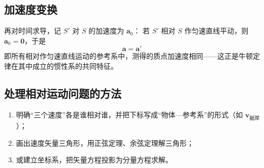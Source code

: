     \subsection{加速度变换}
    再对时间求导，记 $S'$ 对 $S$ 的加速度为 $\boldsymbol{a}_{0}$：
    若 $S'$ 相对 $S$ 作匀速直线平动，则 $\boldsymbol{a}_{0}=\boldsymbol{0}$，于是
    \[
    \boldsymbol{a}=\boldsymbol{a}'
    \]
    即所有相对作匀速直线运动的参考系中，测得的质点加速度相同——这正是牛顿定律在其中成立的惯性系的共同特征。

    \subsection{处理相对运动问题的方法}
    \begin{enumerate}
        \item 明确“三个速度”各是谁相对谁，并把下标写成“物体—参考系”的形式（如 $\boldsymbol{v}_{\text{艇岸}}$）；
        \item 画出速度矢量三角形，用正弦定理、余弦定理解三角形；
        \item 或建立坐标系，把矢量方程投影为分量方程求解。
    \end{enumerate}
